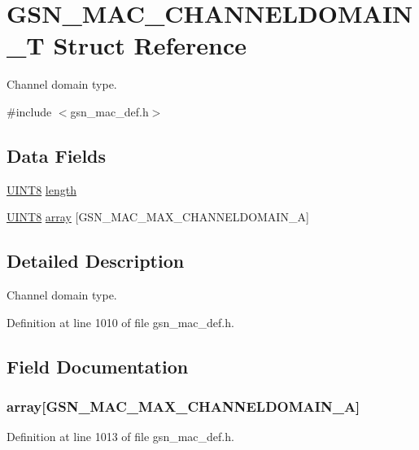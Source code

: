 \hypertarget{a00113}{
\section{GSN\_\-MAC\_\-CHANNELDOMAIN\_\-T Struct Reference}
\label{a00113}
}


Channel domain type.  




{\ttfamily \#include $<$gsn\_\-mac\_\-def.h$>$}

\subsection*{Data Fields}
\begin{DoxyCompactItemize}
\item 
\hyperlink{a00660_gab27e9918b538ce9d8ca692479b375b6a}{UINT8} \hyperlink{a00113_ae360fb41f422c7c83b87d9af070cbd31}{length}
\item 
\hyperlink{a00660_gab27e9918b538ce9d8ca692479b375b6a}{UINT8} \hyperlink{a00113_a88108068858b56ceffb69aa69d194d9d}{array} \mbox{[}GSN\_\-MAC\_\-MAX\_\-CHANNELDOMAIN\_\-A\mbox{]}
\end{DoxyCompactItemize}


\subsection{Detailed Description}
Channel domain type. 

Definition at line 1010 of file gsn\_\-mac\_\-def.h.



\subsection{Field Documentation}
\hypertarget{a00113_a88108068858b56ceffb69aa69d194d9d}{
\subsubsection[{array}]{ {\bf array}\mbox{[}GSN\_\-MAC\_\-MAX\_\-CHANNELDOMAIN\_\-A\mbox{]}}}
\label{a00113_a88108068858b56ceffb69aa69d194d9d}


Definition at line 1013 of file gsn\_\-mac\_\-def.h.

